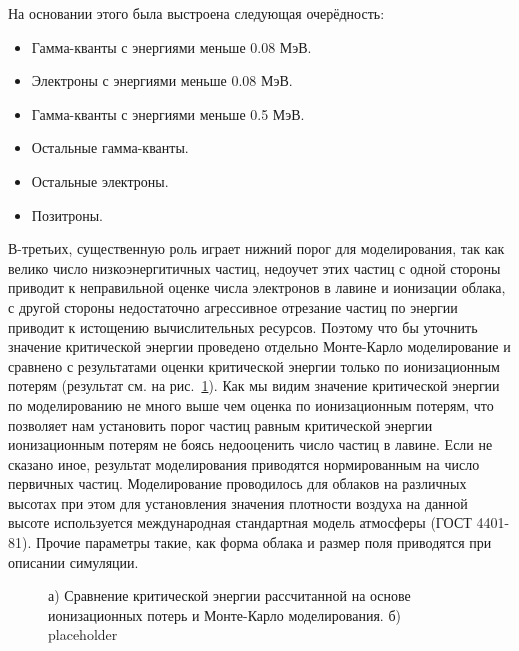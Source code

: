 На основании этого была выстроена следующая очерёдность:
\begin{itemize}
    \item Гамма-кванты с энергиями меньше 0.08 МэВ.
    \item Электроны с энергиями меньше 0.08 МэВ.
    \item Гамма-кванты с энергиями меньше 0.5 МэВ.
    \item Остальные гамма-кванты.
    \item Остальные электроны.
    \item Позитроны.
\end{itemize}
В-третьих, существенную роль играет нижний порог для моделирования, так как велико число низкоэнергитичных частиц, недоучет этих частиц с одной стороны приводит к неправильной оценке числа электронов в лавине и ионизации облака, с другой стороны недостаточно агрессивное отрезание частиц по энергии приводит к истощению вычислительных ресурсов. Поэтому что бы уточнить значение критической энергии проведено отдельно Монте-Карло моделирование и сравнено с результатами оценки критической энергии только по ионизационным потерям (результат см. на рис.~\ref{fig:storm:simcrit}). Как мы видим значение критической энергии по моделированию не много выше чем оценка по ионизационным потерям, что позволяет нам установить порог частиц равным критической энергии ионизационным потерям не боясь недооценить число частиц в лавине.
Если не сказано иное, результат моделирования приводятся нормированным на число первичных частиц. Моделирование проводилось для облаков на различных высотах при этом для установления значения плотности воздуха на данной высоте используется международная стандартная модель атмосферы (ГОСТ 4401-81). Прочие параметры такие, как форма облака и размер поля приводятся при описании симуляции.


\begin{figure}[t]
    \begin{center}
        \begin{minipage}[h]{0.49\linewidth}
        \end{minipage}
        \hfill
        \begin{minipage}[h]{0.49\linewidth}
        \end{minipage}
        \caption{а) Сравнение критической энергии рассчитанной на основе ионизационных потерь и Монте-Карло моделирования. б) placeholder}
    \end{center}
    \label{fig:storm:simcrit}
\end{figure}

